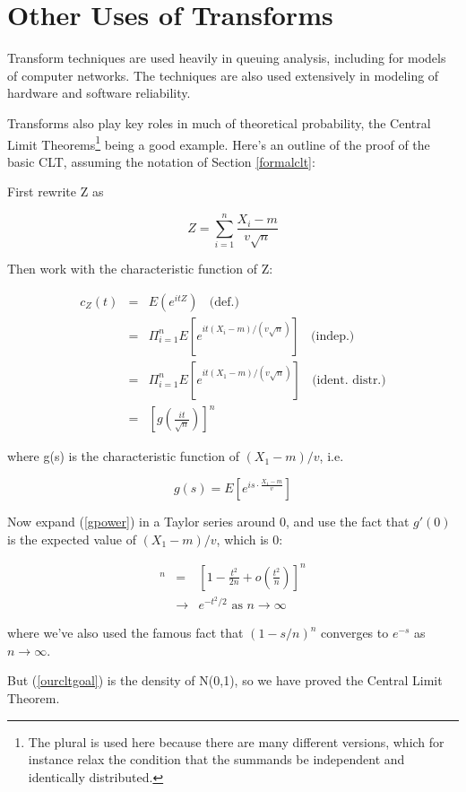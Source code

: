 \section{Other Uses of Transforms}

Transform techniques are used heavily in queuing analysis, including for
models of computer networks.  The techniques are also used extensively
in modeling of hardware and software reliability.

Transforms also play key roles in much of theoretical probability, the
Central Limit Theorems\footnote{The plural is used here because there
are many different versions, which for instance relax the condition that
the summands be independent and identically distributed.} being a good
example.  Here's an outline of the proof of the basic CLT, assuming the
notation of Section \ref{formalclt}:

First rewrite Z as

\begin{equation}
Z = \sum_{i=1}^n \frac{X_i - m}{v \sqrt{n}}
\end{equation}

Then work with the characteristic function of Z:

\begin{eqnarray}
c_Z(t) &=& E(e^{itZ}) ~~~~ \textrm{(def.)} \\ 
&=& \Pi_{i=1}^n E[e^{it(X_i-m)/(v\sqrt{n})}] ~~~~ \textrm{(indep.)} \\
&=&  \Pi_{i=1}^n E[e^{it(X_1-m)/(v\sqrt{n})}] ~~~~ \textrm{(ident. distr.)} \\
&=& [g(\frac{it}{\sqrt{n}})]^n
\label{gpower}
\end{eqnarray}

where g(s) is the characteristic function of $(X_1-m)/v$, i.e.

\begin{equation}
g(s) = E[e^{is \cdot \frac{X_1 - m}{v}}]
\end{equation}

Now expand (\ref{gpower}) in a Taylor series around 0, and use the fact
that $g'(0)$ is the expected value of $(X_1-m)/v$, which is 0:

\begin{eqnarray}
[g(\frac{t}{\sqrt{n}})]^n 
&=& \left [1 - \frac{t^2}{2n} + o(\frac{t^2}{n}) \right ]^n \\
&\rightarrow& e^{-t^2/2} \textrm{ as } n \rightarrow \infty
\label{ourcltgoal}
\end{eqnarray}

where we've also used the famous fact that $(1 - s/n)^n$ converges to
$e^{-s}$ as $n \rightarrow \infty$.

But (\ref{ourcltgoal}) is the density of N(0,1), so we have proved the
Central Limit Theorem.


